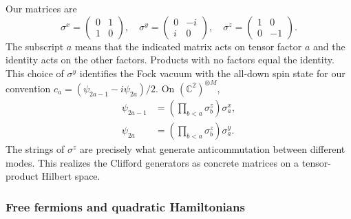 \documentclass[11pt]{article}
\numberwithin{equation}{section}
\theoremstyle{exposition}
\theoremstyle{result}
\newcommand{\C}{\mathbb C}
\begin{document}
Our matrices are
\begin{equation*}
\sigma^x=\begin{pmatrix}0&1\\1&0\end{pmatrix},\quad
\sigma^y=\begin{pmatrix}0&-i\\i&0\end{pmatrix},\quad
\sigma^z=\begin{pmatrix}1&0\\0&-1\end{pmatrix}.
\end{equation*}
The subscript $a$ means that the indicated matrix acts on tensor factor $a$ and the identity acts on the other factors. Products with no factors equal the identity. This choice of $\sigma^y$ identifies the Fock vacuum with the all-down spin state for our convention $c_a=(\psi_{2a-1}-i\psi_{2a})/2$. On $(\C^2)^{\otimes M}$,
\begin{align*}
\psi_{2a-1}&=
\left(\prod_{b<a}\sigma_b^z\right)\sigma_a^x,\\
\psi_{2a}&=
\left(\prod_{b<a}\sigma_b^z\right)\sigma_a^y.
\end{align*}
The strings of $\sigma^z$ are precisely what generate anticommutation between different modes. This realizes the Clifford generators as concrete matrices on a tensor-product Hilbert space.

\subsubsection{Free fermions and quadratic Hamiltonians}
\end{document}
